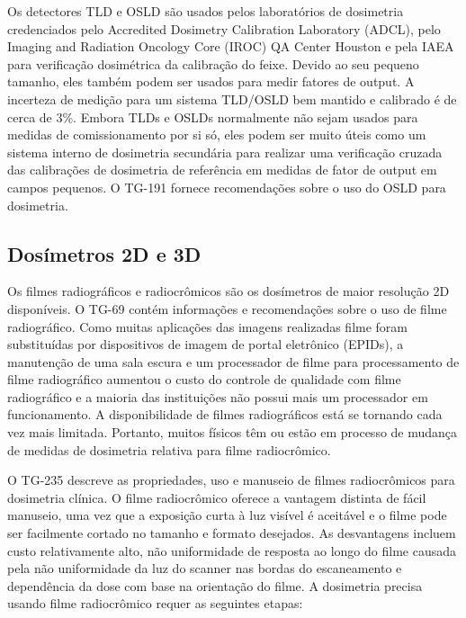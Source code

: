 \documentclass[11pt,a4paper]{article}
\begin{document}
	Os detectores TLD e OSLD são usados pelos laboratórios de dosimetria credenciados pelo Accredited Dosimetry Calibration Laboratory (ADCL), pelo Imaging and Radiation Oncology Core (IROC) QA Center Houston e pela IAEA para verificação dosimétrica da calibração do feixe. Devido ao seu pequeno tamanho, eles também podem ser usados para medir fatores de output. A incerteza de medição para um sistema TLD/OSLD bem mantido e calibrado é de cerca de 3\%. Embora TLDs e OSLDs normalmente não sejam usados para medidas de comissionamento por si só, eles podem ser muito úteis como um sistema interno de dosimetria secundária para realizar uma verificação cruzada das calibrações de dosimetria de referência em medidas de fator de output em campos pequenos. O TG-191 fornece recomendações sobre o uso do OSLD para dosimetria. 

\subsection*{Dosímetros 2D e 3D}

	Os filmes radiográficos e radiocrômicos são os dosímetros de maior resolução 2D disponíveis. O TG-69 contém informações e recomendações sobre o uso de filme radiográfico. Como muitas aplicações das imagens realizadas filme foram substituídas por dispositivos de imagem de portal eletrônico (EPIDs), a manutenção de uma sala escura e um processador de filme para processamento de filme radiográfico aumentou o custo do controle de qualidade com filme radiográfico e a maioria das instituições não possui mais um processador em funcionamento. A disponibilidade de filmes radiográficos está se tornando cada vez mais limitada. Portanto, muitos físicos têm ou estão em processo de mudança de medidas de dosimetria relativa para filme radiocrômico.

	O TG-235 descreve as propriedades, uso e manuseio de filmes radiocrômicos para dosimetria clínica. O filme radiocrômico oferece a vantagem distinta de fácil manuseio, uma vez que a exposição curta à luz visível é aceitável e o filme pode ser facilmente cortado no tamanho e formato desejados. As desvantagens incluem custo relativamente alto, não uniformidade de resposta ao longo do filme causada pela não uniformidade da luz do scanner nas bordas do escaneamento e dependência da dose com base na orientação do filme. A dosimetria precisa usando filme radiocrômico requer as seguintes etapas:
\end{document}
